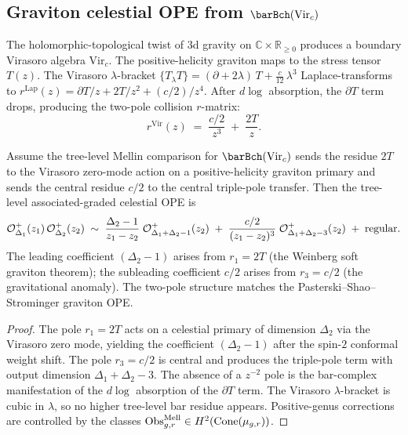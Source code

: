 \subsection{Graviton celestial OPE from $\barBch(\mathrm{Vir}_c)$}
\label{subsec:ch-core-graviton-celestial-ope}

The holomorphic-topological twist of $3$d gravity on $\mathbb{C} \times \mathbb{R}_{\ge 0}$ produces a boundary Virasoro algebra $\mathrm{Vir}_c$. The positive-helicity graviton maps to the stress tensor~$T(z)$. The Virasoro $\lambda$-bracket $\{T{}_\lambda T\} = (\partial + 2\lambda)\,T + \frac{c}{12}\,\lambda^3$ Laplace-transforms to $r^{\mathrm{Lap}}(z) = \partial T/z + 2T/z^2 + (c/2)/z^4$. After $d\log$ absorption, the $\partial T$ term drops, producing the two-pole collision $r$-matrix:
\[
r^{\mathrm{Vir}}(z) \;=\; \frac{c/2}{z^3} \;+\; \frac{2T}{z}.
\]

\begin{theorem}
\label{thm:ch-core-celestial-graviton-ope}
Assume the tree-level Mellin comparison for $\barBch(\mathrm{Vir}_c)$ sends the residue
$2T$ to the Virasoro zero-mode action on a positive-helicity graviton primary and sends the
central residue $c/2$ to the central triple-pole transfer. Then the tree-level
associated-graded celestial OPE is
\[
\mathcal{O}^+_{\Delta_1}(z_1)\,\mathcal{O}^+_{\Delta_2}(z_2)
\;\sim\;
\frac{\Delta_2 - 1}{z_1 - z_2}\;
\mathcal{O}^+_{\Delta_1 + \Delta_2 - 1}(z_2)
\;+\;
\frac{c/2}{(z_1 - z_2)^3}\;
\mathcal{O}^+_{\Delta_1 + \Delta_2 - 3}(z_2)
\;+\; \textup{regular}.
\]
The leading coefficient $(\Delta_2 - 1)$ arises from $r_1 = 2T$ (the Weinberg soft graviton theorem); the subleading coefficient $c/2$ arises from $r_3 = c/2$ (the gravitational anomaly). The two-pole structure matches the Pasterski--Shao--Strominger graviton OPE.
\end{theorem}

\begin{proof}
The pole $r_1 = 2T$ acts on a celestial primary of dimension $\Delta_2$ via the Virasoro zero
mode, yielding the coefficient $(\Delta_2 - 1)$ after the spin-$2$ conformal weight shift.
The pole $r_3 = c/2$ is central and produces the triple-pole term with output dimension
\(\Delta_1+\Delta_2-3\). The absence of a $z^{-2}$ pole is the bar-complex manifestation of
the $d\log$ absorption of the $\partial T$ term. The Virasoro $\lambda$-bracket is cubic in
\(\lambda\), so no higher tree-level bar residue appears. Positive-genus corrections are
controlled by the classes
\(\operatorname{Obs}^{\mathrm{Mell}}_{g,r}\in H^2(\operatorname{Cone}(\mu_{g,r}))\).
\end{proof}


